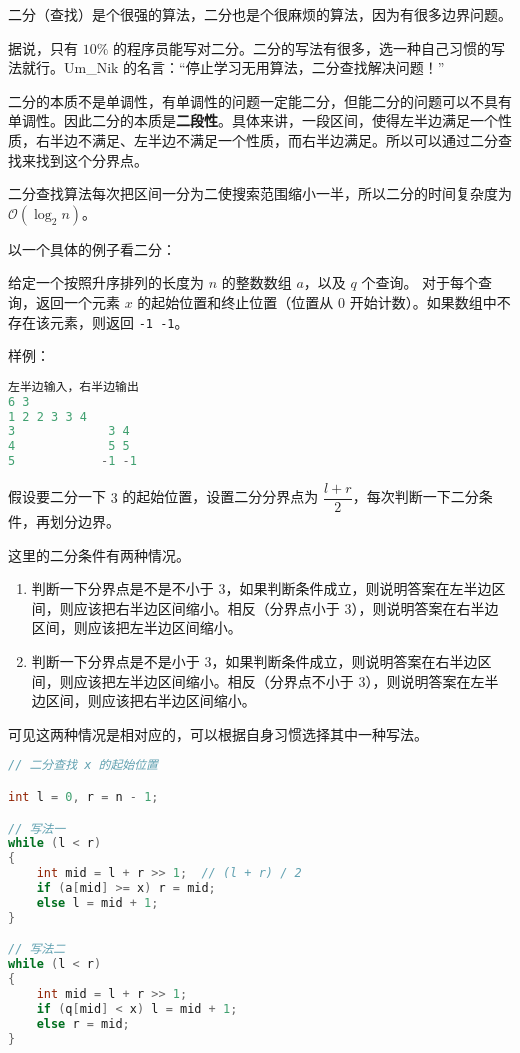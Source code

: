 
二分（查找）是个很强的算法，二分也是个很麻烦的算法，因为有很多边界问题。

据说，只有 $10 \%$ 的程序员能写对二分。二分的写法有很多，选一种自己习惯的写法就行。Um\_Nik 的名言：“停止学习无用算法，二分查找解决问题！”

二分的本质不是单调性，有单调性的问题一定能二分，但能二分的问题可以不具有单调性。因此二分的本质是\textbf{二段性}。具体来讲，一段区间，使得左半边满足一个性质，右半边不满足、左半边不满足一个性质，而右半边满足。所以可以通过二分查找来找到这个分界点。

二分查找算法每次把区间一分为二使搜索范围缩小一半，所以二分的时间复杂度为 $\mathcal{O}(\log_2 n)$。

以一个具体的例子看二分：

给定一个按照升序排列的长度为 $n$ 的整数数组 $a$，以及 $q$ 个查询。
对于每个查询，返回一个元素 $x$ 的起始位置和终止位置（位置从 $0$ 开始计数）。如果数组中不存在该元素，则返回 \verb`-1 -1`。

样例：
\begin{lstlisting}[language=cpp]
左半边输入，右半边输出
6 3
1 2 2 3 3 4
3             3 4
4             5 5
5            -1 -1
\end{lstlisting}

假设要二分一下 $3$ 的起始位置，设置二分分界点为 $\dfrac{l+r}{2}$，每次判断一下二分条件，再划分边界。

这里的二分条件有两种情况。

\begin{enumerate}
\item 判断一下分界点是不是不小于 $3$，如果判断条件成立，则说明答案在左半边区间，则应该把右半边区间缩小。相反（分界点小于 $3$），则说明答案在右半边区间，则应该把左半边区间缩小。
\item 判断一下分界点是不是小于 $3$，如果判断条件成立，则说明答案在右半边区间，则应该把左半边区间缩小。相反（分界点不小于 $3$），则说明答案在左半边区间，则应该把右半边区间缩小。
\end{enumerate}
可见这两种情况是相对应的，可以根据自身习惯选择其中一种写法。

\begin{lstlisting}[language=cpp]
// 二分查找 x 的起始位置

int l = 0, r = n - 1;

// 写法一
while (l < r)
{
	int mid = l + r >> 1;  // (l + r) / 2
    if (a[mid] >= x) r = mid;
    else l = mid + 1;
}

// 写法二
while (l < r)
{
    int mid = l + r >> 1;
    if (q[mid] < x) l = mid + 1;
    else r = mid;
}
\end{lstlisting}


